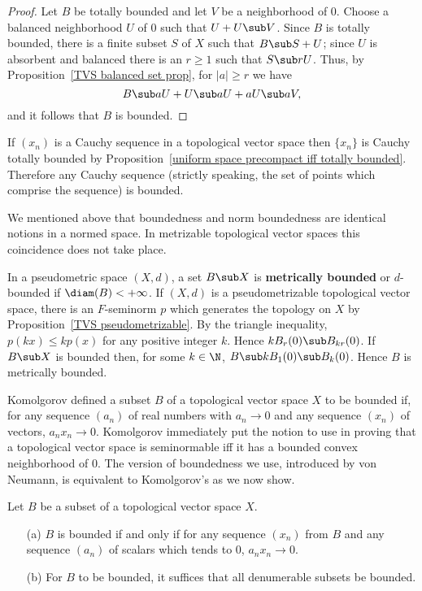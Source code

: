 \begin{proof}
Let $B$ be totally bounded and let $V$ be a neighborhood of $0$. Choose a balanced neighborhood $U$ of $0$ such that $U+U\sub V$. Since $B$ is totally bounded, there is a finite subset $S$ of $X$ such that $B\sub S+U$; since $U$ is absorbent and balanced there is an $r\geq 1$ such that $S\sub rU$. Thus, by Proposition~\ref{TVS balanced set prop}, for $|a|\geq r$ we have
\[B\sub aU+U\sub aU+aU\sub aV,\]
and it follows that $B$ is bounded.
\end{proof}
If $(x_n)$ is a Cauchy sequence in a topological vector space then $\{x_n\}$ is Cauchy totally bounded by Proposition~\ref{uniform space precompact iff totally bounded}. Therefore any Cauchy sequence (strictly speaking, the set of points which comprise the sequence) is bounded.\par
We mentioned above that boundedness and norm boundedness are identical notions in a normed space. In metrizable topological vector spaces this coincidence does not take place.
\begin{example}\label{TVS bounded and metric bounded}
In a pseudometric space $(X,d)$, a set $B\sub X$ is \textbf{metrically bounded} or $d$-bounded if $\diam(B)<+\infty$. If $(X,d)$ is a pseudometrizable topological vector space, there is an $F$-seminorm $p$ which generates the topology on $X$ by Proposition~\ref{TVS pseudometrizable}. By the triangle inequality, $p(kx)\leq kp(x)$ for any positive integer $k$. Hence $kB_r(0)\sub B_{kr}(0)$. If $B\sub X$ is bounded then, for some $k\in\N$, $B\sub kB_1(0)\sub B_k(0)$. Hence $B$ is metrically bounded.
\end{example}
Komolgorov defined a subset $B$ of a topological vector space $X$ to be bounded if, for any sequence $(a_n)$ of real numbers with $a_n\to 0$ and any sequence $(x_n)$ of vectors, $a_nx_n\to 0$. Komolgorov immediately put the notion to use in proving that a topological vector space is seminormable iff it has a bounded convex neighborhood of $0$. The version of boundedness we use, introduced by von Neumann, is equivalent to Komolgorov's as we now show.
\begin{proposition}\label{TVS bounded set iff}
Let $B$ be a subset of a topological vector space $X$.
\begin{itemize}
\item[(a)] $B$ is bounded if and only if for any sequence $(x_n)$ from $B$ and any sequence $(a_n)$ of scalars which tends to $0$, $a_nx_n\to 0$.
\item[(b)] For $B$ to be bounded, it suffices that all denumerable subsets be bounded.
\end{itemize}
\end{proposition}
